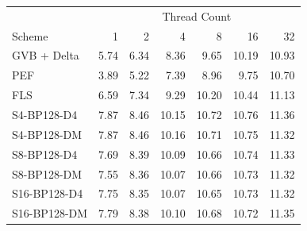 \begin{tabular}{lrrrrrr}
\toprule
 & \multicolumn{6}{c}{Thread Count} \\
Scheme & 1 & 2 & 4 & 8 & 16 & 32 \\
\midrule
GVB + Delta & 5.74 & 6.34 & 8.36 & 9.65 & 10.19 & 10.93 \\
PEF & 3.89 & 5.22 & 7.39 & 8.96 & 9.75 & 10.70 \\
FLS & 6.59 & 7.34 & 9.29 & 10.20 & 10.44 & 11.13 \\
S4-BP128-D4 & 7.87 & 8.46 & 10.15 & 10.72 & 10.76 & 11.36 \\
S4-BP128-DM & 7.87 & 8.46 & 10.16 & 10.71 & 10.75 & 11.32 \\
S8-BP128-D4 & 7.69 & 8.39 & 10.09 & 10.66 & 10.74 & 11.33 \\
S8-BP128-DM & 7.55 & 8.36 & 10.07 & 10.66 & 10.73 & 11.32 \\
S16-BP128-D4 & 7.75 & 8.35 & 10.07 & 10.65 & 10.73 & 11.32 \\
S16-BP128-DM & 7.79 & 8.38 & 10.10 & 10.68 & 10.72 & 11.35 \\
\bottomrule
\end{tabular}
